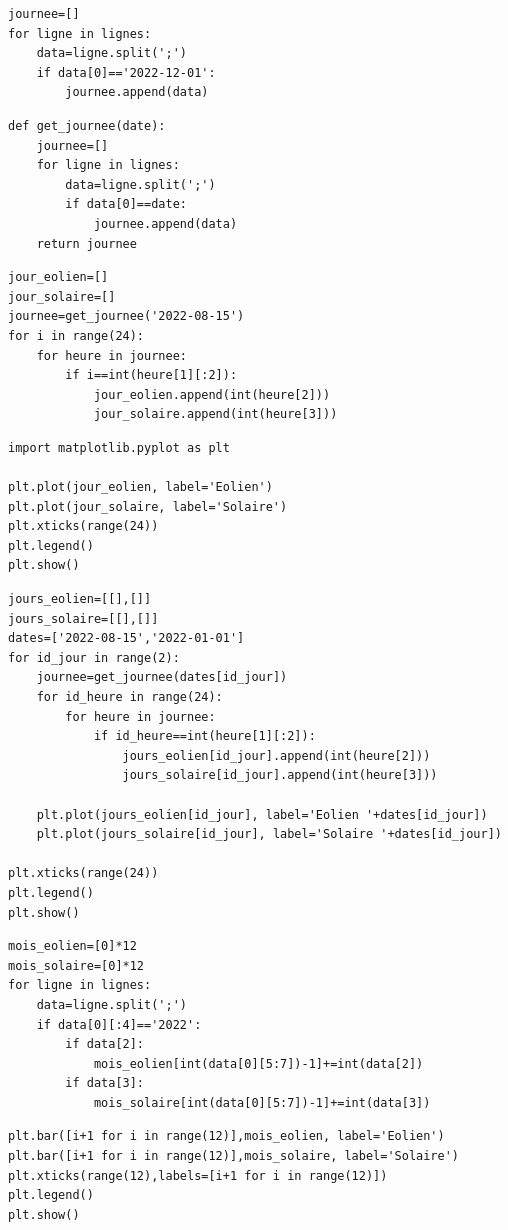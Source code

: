 \reponse{}

\begin{verbatim}
journee=[]
for ligne in lignes:
    data=ligne.split(';')
    if data[0]=='2022-12-01':
        journee.append(data)
\end{verbatim}

\reponse{}

\begin{verbatim}
def get_journee(date):
    journee=[]
    for ligne in lignes:
        data=ligne.split(';')
        if data[0]==date:
            journee.append(data)
    return journee
\end{verbatim}

\reponse{}

\begin{verbatim}
jour_eolien=[]
jour_solaire=[]
journee=get_journee('2022-08-15')
for i in range(24):
    for heure in journee:
        if i==int(heure[1][:2]):
            jour_eolien.append(int(heure[2]))
            jour_solaire.append(int(heure[3]))
\end{verbatim}

\reponse{}
     
\begin{verbatim}    
import matplotlib.pyplot as plt
 
plt.plot(jour_eolien, label='Eolien')
plt.plot(jour_solaire, label='Solaire')
plt.xticks(range(24))
plt.legend()
plt.show()
\end{verbatim}

\reponse{}

\begin{verbatim}
jours_eolien=[[],[]]
jours_solaire=[[],[]]
dates=['2022-08-15','2022-01-01']
for id_jour in range(2):
    journee=get_journee(dates[id_jour])
    for id_heure in range(24):
        for heure in journee:
            if id_heure==int(heure[1][:2]):
                jours_eolien[id_jour].append(int(heure[2]))
                jours_solaire[id_jour].append(int(heure[3]))

    plt.plot(jours_eolien[id_jour], label='Eolien '+dates[id_jour])
    plt.plot(jours_solaire[id_jour], label='Solaire '+dates[id_jour])

plt.xticks(range(24))
plt.legend()
plt.show()
\end{verbatim}

\reponse{}

\begin{verbatim}
mois_eolien=[0]*12
mois_solaire=[0]*12
for ligne in lignes:
    data=ligne.split(';')
    if data[0][:4]=='2022':
        if data[2]:
            mois_eolien[int(data[0][5:7])-1]+=int(data[2])
        if data[3]:
            mois_solaire[int(data[0][5:7])-1]+=int(data[3])
\end{verbatim}

\reponse{}

\begin{verbatim}
plt.bar([i+1 for i in range(12)],mois_eolien, label='Eolien')
plt.bar([i+1 for i in range(12)],mois_solaire, label='Solaire')
plt.xticks(range(12),labels=[i+1 for i in range(12)])
plt.legend()
plt.show()
\end{verbatim}    


